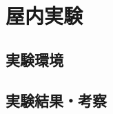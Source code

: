 \documentclass[../main]{subfiles}
\begin{document}
\section{屋内実験}
\label{sec:vexp_spectral-reflectance}

\subsection{実験環境}
\label{subsec:vexp_ref_environmet}

\subsection{実験結果・考察}
\label{subsec:vexp_ref_result}
\end{document}
